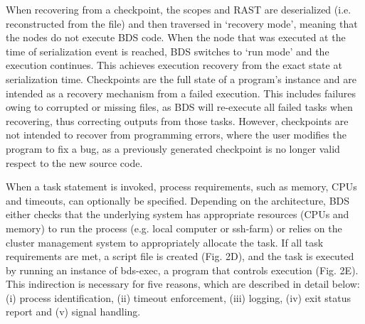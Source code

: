 When recovering from a checkpoint, the scopes and RAST are deserialized (i.e. reconstructed from the file) and then traversed in ‘recovery mode’, meaning that the nodes do not execute BDS code. When the node that was executed at the time of serialization event is reached, BDS switches to ‘run mode’ and the execution continues. This achieves execution recovery from the exact state at serialization time. Checkpoints are the full state of a program’s instance and are intended as a recovery mechanism from a failed execution. This includes failures owing to corrupted or missing files, as BDS will re-execute all failed tasks when recovering, thus correcting outputs from those tasks. However, checkpoints are not intended to recover from programming errors, where the user modifies the program to fix a bug, as a previously generated checkpoint is no longer valid respect to the new source code.

When a task statement is invoked, process requirements, such as memory, CPUs and timeouts, can optionally be specified. Depending on the architecture, BDS either checks that the underlying system has appropriate resources (CPUs and memory) to run the process (e.g. local computer or ssh-farm) or relies on the cluster management system to appropriately allocate the task. If all task requirements are met, a script file is created (Fig. 2D), and the task is executed by running an instance of bds-exec, a program that controls execution (Fig. 2E). This indirection is necessary for five reasons, which are described in detail below: (i) process identification, (ii) timeout enforcement, (iii) logging, (iv) exit status report and (v) signal handling.

